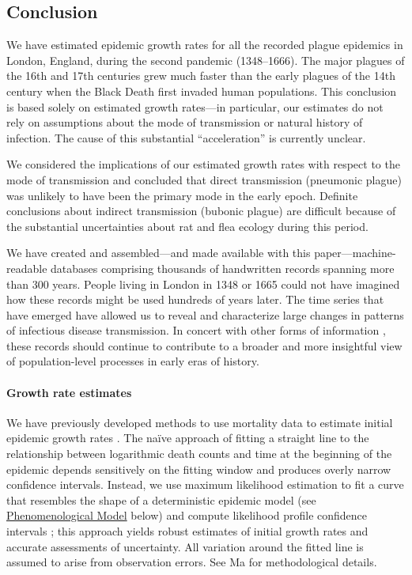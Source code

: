 \subsection*{Conclusion}

We have estimated epidemic growth rates for all the recorded plague epidemics in London, England, during the second pandemic (1348--1666). The major plagues of the 16th and 17th centuries grew much faster than the early plagues of the 14th century when the Black Death first invaded human populations.  This conclusion is based solely on estimated growth rates---in particular, our estimates do not rely on assumptions about the mode of transmission or natural history of infection.  The cause of this substantial ``acceleration'' is currently unclear.

We considered the implications of our estimated growth rates with respect to the mode of transmission and concluded that direct transmission (pneumonic plague) was unlikely to have been the primary mode in the early epoch. Definite conclusions about indirect transmission (bubonic plague) are difficult because of the substantial uncertainties about rat and flea ecology during this period.

We have created and assembled---and made available with this paper---machine-readable databases comprising thousands of handwritten records spanning more than 300 years.  People living in London in 1348 or 1665 could not have imagined how these records might be used hundreds of years later.  The time series that have emerged have allowed us to reveal and characterize large changes in patterns of infectious disease transmission.  In concert with other forms of information \cite{Cumm+16,Abbo17}, these records should continue to contribute to a broader and more insightful view of population-level processes in early eras of history.

\hypertarget{Methods}{}

\paragraph{Growth rate estimates}

We have previously developed methods to 
use mortality data to estimate initial epidemic growth rates \cite{Ma+14}.
The na\"ive approach of fitting a straight line to the relationship between logarithmic death counts and time at the beginning of the epidemic depends sensitively on the fitting window and produces overly narrow confidence intervals.  Instead, we use maximum likelihood estimation to fit a curve that resembles the shape of a deterministic epidemic model (see \hyperlink{phenmod}{Phenomenological Model} below) and compute likelihood profile confidence intervals \cite{Bolk08}; this approach yields robust estimates of initial growth rates and accurate assessments of uncertainty.  All variation around the fitted line is assumed to arise from  observation errors.  See Ma \etal \cite{Ma+14} for methodological details. 

